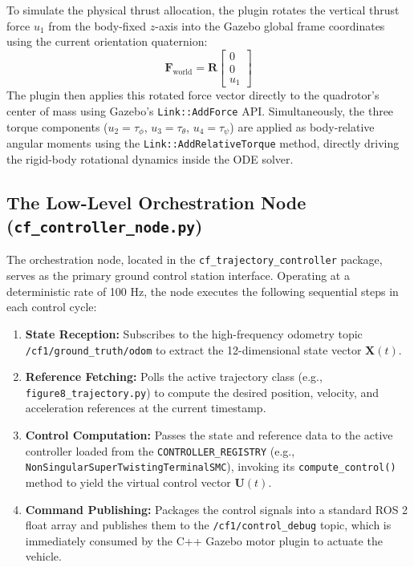 To simulate the physical thrust allocation, the plugin rotates the vertical thrust force $u_1$ from the body-fixed $z$-axis into the Gazebo global frame coordinates using the current orientation quaternion:
\begin{equation}
\bm{F}_{\text{world}} = \bm{R} \begin{bmatrix} 0 \\ 0 \\ u_1 \end{bmatrix}
\end{equation}
The plugin then applies this rotated force vector directly to the quadrotor's center of mass using Gazebo's \texttt{Link::AddForce} API. Simultaneously, the three torque components ($u_2 = \tau_{\phi}$, $u_3 = \tau_{\theta}$, $u_4 = \tau_{\psi}$) are applied as body-relative angular moments using the \texttt{Link::AddRelativeTorque} method, directly driving the rigid-body rotational dynamics inside the ODE solver.

\subsection{The Low-Level Orchestration Node (\texttt{cf\_controller\_node.py})}
The orchestration node, located in the \texttt{cf\_trajectory\_controller} package, serves as the primary ground control station interface. Operating at a deterministic rate of 100 Hz, the node executes the following sequential steps in each control cycle:
\begin{enumerate}
    \item \textbf{State Reception:} Subscribes to the high-frequency odometry topic \texttt{/cf1/ground\_truth/odom} to extract the 12-dimensional state vector $\bm{X}(t)$.
    \item \textbf{Reference Fetching:} Polls the active trajectory class (e.g., \texttt{figure8\_trajectory.py}) to compute the desired position, velocity, and acceleration references at the current timestamp.
    \item \textbf{Control Computation:} Passes the state and reference data to the active controller loaded from the \texttt{CONTROLLER\_REGISTRY} (e.g., \texttt{NonSingularSuperTwistingTerminalSMC}), invoking its \texttt{compute\_control()} method to yield the virtual control vector $\bm{U}(t)$.
    \item \textbf{Command Publishing:} Packages the control signals into a standard ROS 2 float array and publishes them to the \texttt{/cf1/control\_debug} topic, which is immediately consumed by the C++ Gazebo motor plugin to actuate the vehicle.
\end{enumerate}

